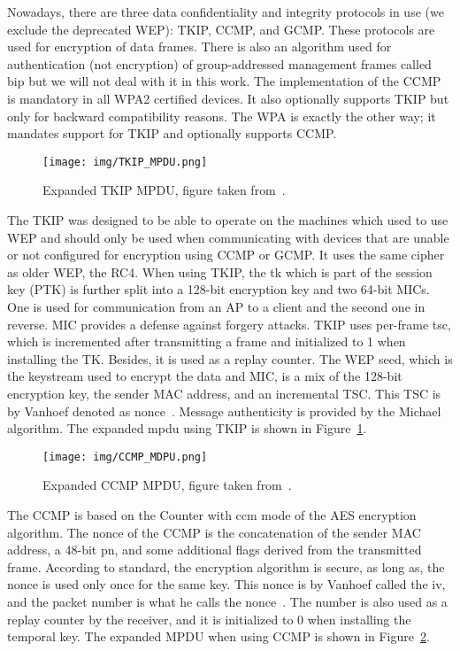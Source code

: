 Nowadays, there are three data confidentiality and integrity protocols in use (we exclude the deprecated WEP): TKIP, CCMP, and GCMP. These protocols are used for encryption of data frames. There is also an algorithm used for authentication (not encryption) of group-addressed management frames called \gls{bip} but we will not deal with it in this work. The implementation of the CCMP is mandatory in all WPA2 certified devices. It also optionally supports TKIP but only for backward compatibility reasons. The WPA is exactly the other way; it mandates support for TKIP and optionally supports CCMP. 

\begin{figure}[h!]
  \centering
  \texttt{[image: img/TKIP\_MPDU.png]}
  \caption[Expanded TKIP MPDU]{Expanded TKIP MPDU, figure taken from~\cite{ieee802.11i_2004}.}
  \label{fig: TKIP_MPDU}
\end{figure}

The TKIP was designed to be able to operate on the machines which used to use WEP and should only be used when communicating with devices that are unable or not configured for encryption using CCMP or GCMP. It uses the same cipher as older WEP, the RC4. When using TKIP, the \gls{tk} which is part of the session key (PTK) is further split into a 128-bit encryption key and two 64-bit MICs. One is used for communication from an AP to a client and the second one in reverse. MIC provides a defense against forgery attacks. TKIP uses per-frame \gls{tsc}, which is incremented after transmitting a frame and initialized to 1 when installing the TK. Besides, it is used as a replay counter. The WEP seed, which is the keystream used to encrypt the data and MIC, is a mix of the 128-bit encryption key, the sender MAC address, and an incremental TSC. This TSC is by Vanhoef denoted as nonce~\cite{VA_ccs2017}. Message authenticity is provided by the Michael algorithm. The expanded \gls{mpdu} using TKIP is shown in Figure~\ref{fig: TKIP_MPDU}. 

\begin{figure}[h!]
  \centering
  \texttt{[image: img/CCMP\_MDPU.png]}
  \caption[Expanded CCMP MPDU]{Expanded CCMP MPDU, figure taken from~\cite{ieee802.11i_2004}.}
  \label{fig: CCMP_MPDU}
\end{figure} 

The CCMP is based on the Counter with \gls{ccm} mode of the AES encryption algorithm. The nonce of the CCMP is the concatenation of the sender MAC address, a 48-bit \gls{pn}, and some additional flags derived from the transmitted frame. According to standard, the encryption algorithm is secure, as long as, the nonce is used only once for the same key. This nonce is by Vanhoef called the \gls{iv}, and the packet number is what he calls the nonce~\cite{VA_ccs2017}. The number is also used as a replay counter by the receiver, and it is initialized to 0 when installing the temporal key. The expanded MPDU when using CCMP is shown in Figure~\ref{fig: CCMP_MPDU}.

